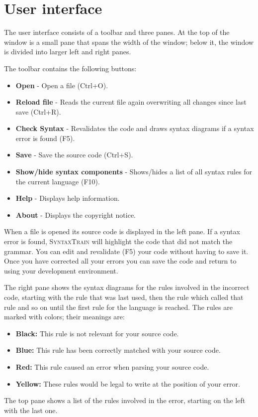 \documentclass[11pt]{article}
\newcommand*{\st}{\textsc{SyntaxTrain}}
\begin{document}
\section{User interface}

The user interface consists of a toolbar and three panes.
At the top of the window is a small pane that spans the width of the
window; below it, the window is divided into larger left and right
panes.

The toolbar contains the following buttons:

\begin{itemize}

\item \textbf{Open} - Open a file (Ctrl+O).
\item \textbf{Reload file} - Reads the current file again
overwriting all changes since last save (Ctrl+R). 
\item \textbf{Check Syntax} - Revalidates the code and draws syntax
diagrams if a syntax error is found (F5).
\item \textbf{Save} - Save the source code (Ctrl+S).
\item \textbf{Show/hide syntax components} - Shows/hides a list of all
syntax rules for the current language (F10).
\item \textbf{Help} - Displays help information.
\item \textbf{About} - Displays the copyright notice.
\end{itemize}

When a file is opened its source code is displayed in the left pane. If
a syntax error is found, \st{} will highlight the code that did not
match the grammar. You can edit and revalidate (F5) your code without
having to save it. Once you have corrected all your errors you can save
the code and return to using your development environment.

The right pane shows the syntax diagrams for the rules involved in the
incorrect code, starting with the rule that was last used, then the rule
which called that rule and so on until the first rule for the language
is reached. The rules are marked with colors; their meanings are:

\begin{itemize}
\item \textbf{Black:} This rule is not relevant for your source code.
\item \textbf{Blue:} This rule has been correctly matched with your
source code.
\item \textbf{Red:} This rule caused an error when parsing your source
code.
\item \textbf{Yellow:} These rules would be legal to write at the
position of your error.
\end{itemize}
The top pane shows a list of the rules involved in the error, starting
on the left with the last one.
\end{document}
